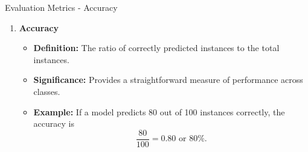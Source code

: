 \documentclass[aspectratio=169]{beamer}
\begin{document}
\begin{frame}[fragile]{Evaluation Metrics - Accuracy}
    \begin{enumerate}
        \item \textbf{Accuracy}
        \begin{itemize}
            \item \textbf{Definition:} The ratio of correctly predicted instances to the total instances.
            \item \textbf{Significance:} Provides a straightforward measure of performance across classes.
            \item \textbf{Example:} If a model predicts 80 out of 100 instances correctly, the accuracy is 
            \[
            \frac{80}{100} = 0.80 \text{ or } 80\%.
            \]
        \end{itemize}
    \end{enumerate}
\end{frame}
\end{document}
